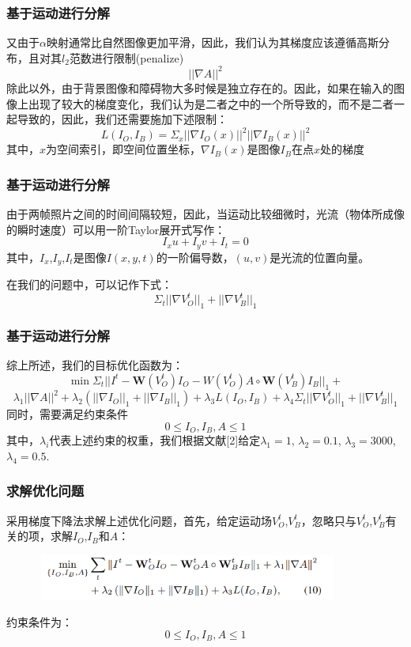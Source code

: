 \documentclass{beamer}
\begin{document}
\begin{frame}
\frametitle{基于运动进行分解}
又由于$\alpha$映射通常比自然图像更加平滑，因此，我们认为其梯度应该遵循高斯分布，且对其$l_2$范数进行限制(penalize)
\begin{equation}
||\nabla A||^2
\end{equation}\pause
除此以外，由于背景图像和障碍物大多时候是独立存在的。因此，如果在输入的图像上出现了较大的梯度变化，我们认为是二者之中的一个所导致的，而不是二者一起导致的，因此，我们还需要施加下述限制：
\begin{equation}
L(I_O,I_B) = \Sigma_x ||\nabla I_O(x)||^2||\nabla I_B(x)||^2
\end{equation}
其中，$x$为空间索引，即空间位置坐标，$\nabla I_B(x)$是图像$I_B$在点$x$处的梯度
\end{frame}
\begin{frame}
\frametitle{基于运动进行分解}
由于两帧照片之间的时间间隔较短，因此，当运动比较细微时，光流（物体所成像的瞬时速度）可以用一阶Taylor展开式写作：
\begin{equation}
I_xu+I_yv+I_t = 0
\end{equation}
其中，$I_x$,$I_y$,$I_t$是图像$I(x,y,t)$的一阶偏导数，$(u,v)$是光流的位置向量。\pause

在我们的问题中，可以记作下式：
\begin{equation}
\Sigma_t||\nabla V_O^t||_1+||\nabla V_B^t||_1
\end{equation}
\end{frame}
\begin{frame}
\frametitle{基于运动进行分解}
综上所述，我们的目标优化函数为：
\begin{equation}
\min \Sigma_t ||I^t-\textbf{W}(V_O^t)I_O-W(V_O^t)A\circ\textbf{W}(V_B^t)I_B||_1+
\end{equation}
\begin{equation}
\lambda_1 ||\nabla A||^2+\lambda_2(||\nabla I_O||_1+||\nabla I_B||_1)+\lambda_3L(I_O,I_B)+\lambda_4\Sigma_t||\nabla V_O^t||_1+||\nabla V_B^t||_1
\end{equation}
同时，需要满足约束条件
\begin{equation}
0\leq I_O,I_B,A\leq 1
\end{equation}\pause
其中，$\lambda_i$代表上述约束的权重，我们根据文献[2]给定$\lambda_1 = 1$, $\lambda_2 = 0.1$, $\lambda_3 = 3000$, $\lambda_4 = 0.5$.
\end{frame}
\begin{frame}
\frametitle{求解优化问题}
采用梯度下降法求解上述优化问题，首先，给定运动场$V_O^t$,$V_B^t$，忽略只与$V_O^t$,$V_B^t$有关的项，求解$I_O$,$I_B$和$A$：
\begin{figure}[!h]
\centering
\includegraphics[height=1.5cm,width=10cm]{2022122603.png}
\end{figure}
约束条件为：
\begin{equation}
0\leq I_O,I_B,A\leq 1
\end{equation}
\end{frame}
\end{document}
